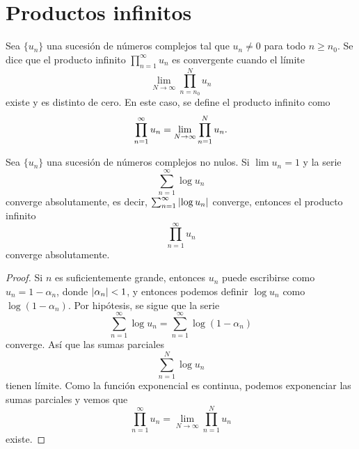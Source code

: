 \section{Productos infinitos}


\begin{definition}
    Sea $\{u_n\}$ una sucesión de números complejos tal que $u_n \neq 0$ para todo $n \geq n_0$. Se dice que el producto infinito $\prod_{n=1}^{\infty} u_n$ es convergente cuando el límite
    \begin{equation*}
        \lim_{N \to \infty} \prod_{n=n_0}^{N} u_n
    \end{equation*}
    existe y es distinto de cero. En este caso, se define el producto infinito como
    \begin{equation*}
        \prod_{n=1}^{\infty} u_n = \lim_{N \to \infty} \prod_{n=1}^{N} u_n. \\
    \end{equation*}
\end{definition}


\begin{prop}
    Sea $\{u_n\}$ una sucesión de números complejos no nulos. Si $\lim u_n =1$ y la serie
    \begin{equation*}
        \sum_{n=1}^{\infty} \log u_n
    \end{equation*}
    converge absolutamente, es decir, $ \sum_{n=1}^{\infty} \left\lvert\log u_n\right\rvert$ converge, entonces el producto infinito
    \begin{equation*}
        \prod_{n=1}^{\infty} u_n
    \end{equation*}
    converge absolutamente.
\end{prop}

\begin{proof}
    Si $n$ es suficientemente grande, entonces $u_n$ puede escribirse como $u_n = 1 - \alpha_n$, donde $\left\lvert\alpha_n\right\rvert < 1$, y entonces podemos definir $\log{u_n}$ como $\log{(1 - \alpha_n)}$. Por hipótesis, se sigue que la serie
    \begin{equation*}
        \sum_{n=1}^{\infty} \log u_n = \sum_{n=1}^{\infty} \log{(1 - \alpha_n)}
    \end{equation*}
    converge. Así que las sumas parciales
    \begin{equation*}
        \sum_{n=1}^{N} \log u_n
    \end{equation*}
    tienen límite. Como la función exponencial es continua, podemos exponenciar las sumas parciales y vemos que
    \begin{equation*}
        \prod_{n=1}^{\infty} u_n = \lim_{N \to \infty} \prod_{n=1}^{N} u_n
    \end{equation*}
    existe.
\end{proof}

